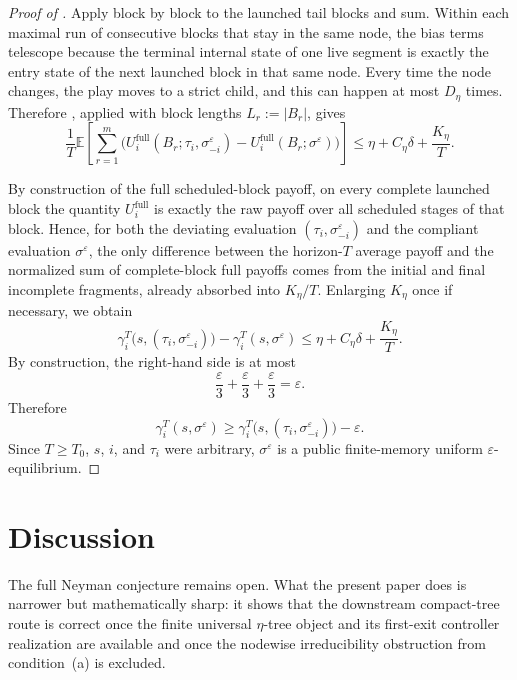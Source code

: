 \documentclass[12pt]{article}
\theoremstyle{definition}
\newcommand{\eps}{\varepsilon}
\newcommand{\E}{\mathbb{E}}
\newcommand{\1}{\mathbf{1}}
\begin{document}
\begin{proof}[Proof of ]
Apply  block by block to the launched tail blocks and sum.
Within each maximal run of consecutive blocks that stay in the same node, the
bias terms telescope because the terminal internal state of one live segment is
exactly the entry state of the next launched block in that same node. Every time
the node changes, the play moves to a strict child, and this can happen at most
$D_\eta$ times. Therefore , applied with block lengths
$L_r:=|B_r|$, gives
\[
\frac1T\E\left[\sum_{r=1}^m
\bigl(
U_i^{\mathrm{full}}(B_r;\tau_i,\sigma^\eps_{-i})
-
U_i^{\mathrm{full}}(B_r;\sigma^\eps)
\bigr)\right]
\le
\eta + C_\eta\delta + \frac{K_\eta}{T}.
\]

By construction of the full scheduled-block payoff, on every complete launched
block the quantity $U_i^{\mathrm{full}}$ is exactly the raw payoff over all
scheduled stages of that block. Hence, for both the deviating evaluation
$(\tau_i,\sigma^\eps_{-i})$ and the compliant evaluation $\sigma^\eps$, the only
difference between the horizon-$T$ average payoff and the normalized sum of
complete-block full payoffs comes from the initial and final incomplete
fragments, already absorbed into $K_\eta/T$. Enlarging $K_\eta$ once if
necessary, we obtain
\[
\gamma_i^T\bigl(s,(\tau_i,\sigma^\eps_{-i})\bigr)
-
\gamma_i^T(s,\sigma^\eps)
\le
\eta + C_\eta\delta + \frac{K_\eta}{T}.
\]
By construction, the right-hand side is at most
\[
\frac{\eps}{3}+\frac{\eps}{3}+\frac{\eps}{3}=\eps.
\]
Therefore
\[
\gamma_i^T(s,\sigma^\eps)
\ge
\gamma_i^T\bigl(s,(\tau_i,\sigma^\eps_{-i})\bigr)-\eps.
\]
Since $T\ge T_0$, $s$, $i$, and $\tau_i$ were arbitrary, $\sigma^\eps$ is a
public finite-memory uniform $\eps$-equilibrium.
\end{proof}

\section{Discussion}

The full Neyman conjecture remains open. What the present paper does is narrower
but mathematically sharp: it shows that the downstream compact-tree route is
correct once the finite universal $\eta$-tree object and its first-exit controller
realization are available and once the nodewise irreducibility obstruction from
condition~\textnormal{(a)} is excluded.
\end{document}
